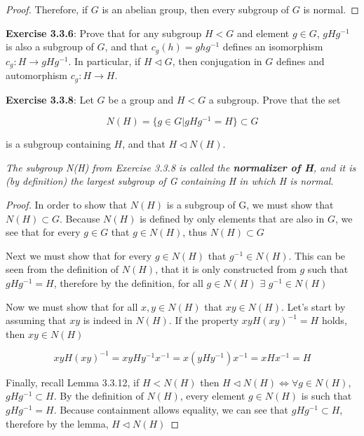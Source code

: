 \documentclass[a4paper]{article}
\begin{document}
\begin{myparindent}{0pt}
\begin{proof}
Therefore, if $G$ is an abelian group, then every subgroup of $G$ is normal.
\end{proof}

\textbf{Exercise 3.3.6}:
Prove that for any subgroup $H < G$ and element $g \in G$, $gHg^{-1}$ is also
a subgroup of $G$, and that $c_g(h) = ghg^{-1}$ defines an isomorphism
$c_g: H \rightarrow gHg^{-1}$. In particular, if $H \triangleleft G$, then
conjugation in $G$ defines and automorphism $c_g: H \rightarrow H$.
\newline

\textbf{Exercise 3.3.8}:
Let $G$ be a group and $H < G$ a subgroup. Prove that the set

\[ N(H) = \{g \in G | gHg^{-1} = H \} \subset G \]
\newline

is a subgroup containing $H$, and that $H \triangleleft N(H)$.

\textit{The subgroup N(H) from Exercise 3.3.8 is called the
\textbf{normalizer of H}, and it is (by definition) the largest subgroup of G
containing H in which H is normal}.
\newline

\begin{proof}
  In order to show that $N(H)$ is a subgroup of G, we must show that
  $N(H) \subset G$. Because $N(H)$ is defined by only elements that are also in
  $G$, we see that for every $g \in G$ that $g \in N(H)$, thus $N(H) \subset G$
  \newline

  Next we must show that for every $g \in N(H)$ that $g^{-1} \in N(H)$. This can
  be seen from the definition of $N(H)$, that it is only constructed from $g$
  such that $gHg^{-1} = H$, therefore by the definition, for all
  $g \in N(H)$ $\exists$ $g^{-1} \in N(H)$
  \newline

  Now we must show that for all $x, y \in N(H)$ that $xy \in N(H)$. Let's
  start by assuming that $xy$ is indeed in $N(H)$. If the property
  $x y H (x y)^{-1} = H$ holds, then $xy \in N(H)$

  \[ x y H (x y)^{-1} = xy H y^{-1} x^{-1} = x(y H y^{-1}) x^{-1} = x H x^{-1} = H \]

  Finally, recall Lemma 3.3.12, if $H < N(H)$ then
  $H \triangleleft N(H) \iff \forall g \in N(H)$, $gHg^{-1} \subset H$.
  By the definition of $N(H)$, every element $g \in N(H)$ is such that $gHg^{-1} = H$.
  Because containment allows equality, we can see that $gHg^{-1} \subset H$,
  therefore by the lemma, $H \triangleleft N(H)$
\end{proof}


\end{myparindent}
\end{document}
